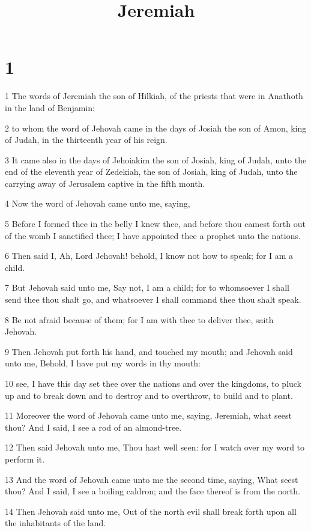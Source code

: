 

\title{Jeremiah}

\chapter{1}

\par 1 The words of Jeremiah the son of Hilkiah, of the priests that were in Anathoth in the land of Benjamin:
\par 2 to whom the word of Jehovah came in the days of Josiah the son of Amon, king of Judah, in the thirteenth year of his reign.
\par 3 It came also in the days of Jehoiakim the son of Josiah, king of Judah, unto the end of the eleventh year of Zedekiah, the son of Josiah, king of Judah, unto the carrying away of Jerusalem captive in the fifth month.
\par 4 Now the word of Jehovah came unto me, saying,
\par 5 Before I formed thee in the belly I knew thee, and before thou camest forth out of the womb I sanctified thee; I have appointed thee a prophet unto the nations.
\par 6 Then said I, Ah, Lord Jehovah! behold, I know not how to speak; for I am a child.
\par 7 But Jehovah said unto me, Say not, I am a child; for to whomsoever I shall send thee thou shalt go, and whatsoever I shall command thee thou shalt speak.
\par 8 Be not afraid because of them; for I am with thee to deliver thee, saith Jehovah.
\par 9 Then Jehovah put forth his hand, and touched my mouth; and Jehovah said unto me, Behold, I have put my words in thy mouth:
\par 10 see, I have this day set thee over the nations and over the kingdoms, to pluck up and to break down and to destroy and to overthrow, to build and to plant.
\par 11 Moreover the word of Jehovah came unto me, saying, Jeremiah, what seest thou? And I said, I see a rod of an almond-tree.
\par 12 Then said Jehovah unto me, Thou hast well seen: for I watch over my word to perform it.
\par 13 And the word of Jehovah came unto me the second time, saying, What seest thou? And I said, I see a boiling caldron; and the face thereof is from the north.
\par 14 Then Jehovah said unto me, Out of the north evil shall break forth upon all the inhabitants of the land.
